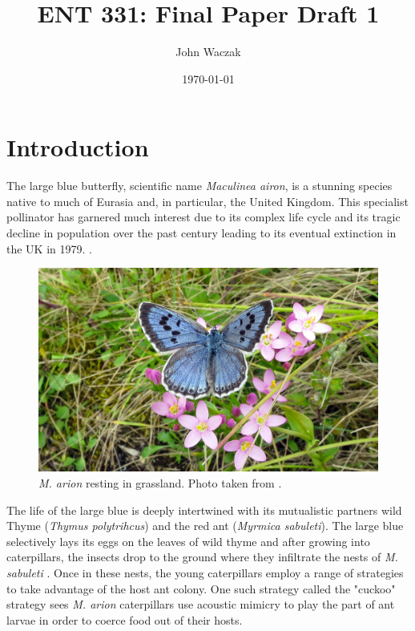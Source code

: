 \documentclass[12pt, twocolumn, letterpaper]{article}
\title{ENT 331: Final Paper Draft 1}
\author{John Waczak}
\date{\today}
\begin{document}
\maketitle

\section*{Introduction}

The large blue butterfly, scientific name \textit{Maculinea airon}, is a
stunning species  native to much of Eurasia and, in particular, the
United Kingdom. This specialist pollinator has garnered much interest due to
its complex life cycle and its tragic decline in population over the past
century leading to its eventual extinction in the UK in 1979.
\cite{noauthor_how_2009}.

\begin{figure}[!hbt]
	\centering
	\includegraphics[width=1\columnwidth]{large_blue_1}
	\caption{\textit{M. arion} resting in grassland. Photo taken from \cite{noauthor_large_2018}.} 
	\label{fig:large_blue_1} 
\end{figure}

The life of the large blue is deeply intertwined with its mutualistic partners wild Thyme (\textit{Thymus polytrihcus}) and the red ant (\textit{Myrmica sabuleti}). The large blue selectively lays its eggs on the leaves of wild thyme and after growing into caterpillars, the insects drop to the ground where they infiltrate the nests of \textit{M. sabuleti} \cite{noauthor_expanding_nodate}. Once in these nests, the young caterpillars employ a range of strategies to take advantage of the host ant colony. One such strategy called the "cuckoo" strategy sees \textit{M. arion} caterpillars use acoustic mimicry to play the part of ant larvae in order to coerce food out of their hosts.  
\end{document}
